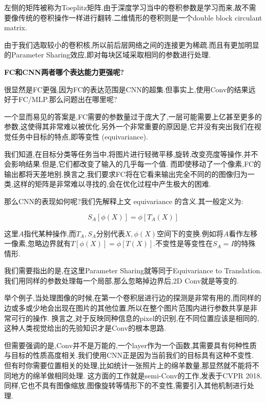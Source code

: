 左侧的矩阵被称为Toeplitz矩阵.由于深度学习当中的卷积参数是学习而来,故不需要像传统的卷积操作一样进行翻转.二维情形的卷积则是一个double block circulant matrix.

由于我们选取较小的卷积核,所以前后层网络之间的连接更为稀疏.而且有更加明显的Parameter Sharing效应,即对每块区域采取相同的参数进行处理.

\textbf{FC和CNN两者哪个表达能力更强呢?}

很显然是FC更强,因为FC的表达范围是CNN的超集.但事实上,使用Conv的结果远好于FC/MLP.那么问题出在哪里呢?

一个显而易见的答案是,FC需要的参数量过于庞大了,一层可能需要上亿甚至更多的参数,这使得其非常难以被优化.另外一个非常重要的原因是,它并没有突出我们在视觉任务中目标的特点,即等变性 (equivariance).

我们知道,在目标分类等任务当中,将图片进行轻微平移,旋转,改变亮度等操作,并不会影响结果.但是,它们都改变了输入的几乎每一个值.
而即使移动了一个像素,FC的输出都将天差地别.换言之,我们要求FC将在它看来输出完全不同的的图像归为一类,这样的矩阵是非常难以寻找的,会在优化过程中产生极大的困难.

那么CNN的表现如何呢?我们先解释上文 equivariance 的含义.其一般定义为:

\begin{equation}
	S_A[\phi(X)] = \phi[T_A(X)]
\end{equation}

这里$A$指代某种操作,而$T_A, S_A$分别代表$X,\phi(X)$空间下的变换.例如将$A$看作左移一像素,忽略边界就有$T[\phi(X)] = \phi[T(X)]$.不变性是等变性在$S_A = I$的特殊情形.

我们需要指出的是,在这里Parameter Sharing就等同于Equivariance to Translation.我们用同样的参数处理每一个局部,那么忽略掉边界后,2D Conv就是等变的.

举个例子,当处理图像的时候,在第一个卷积层进行边的探测是非常有用的,而同样的边或多或少地会出现在图片的其他位置,所以在整个图片范围内进行参数共享是非常可行的操作.
换言之,对于反映同种信息的pixel的识别,在不同位置应该是相同的,这种人类视觉给出的先验知识才是Conv的根本思路.

但需要强调的是,Conv并不是万能的,一个layer作为一个函数,其需要具有何种性质与目标的性质高度相关.我们使用CNN正是因为当前我们的目标具有这种不变性.
但有时你需要位置相关的处理,比如统计一张照片上的绵羊数量,那显然就不能将不同地方的绵羊做相同处理.
这方面的工作就是semi-Conv的工作,发表于CVPR 2018.同样,它也不具有图像缩放,图像旋转等情形下的不变性,需要引入其他机制进行处理.